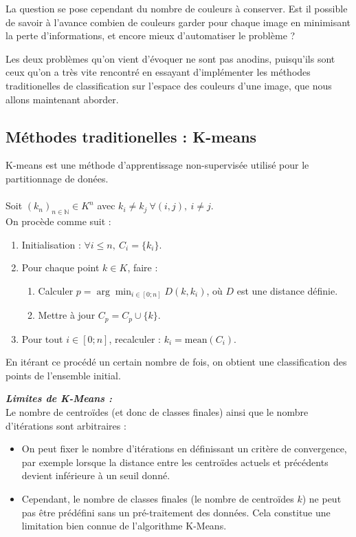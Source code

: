 \documentclass{article}
\begin{document}
La question se pose cependant du nombre de couleurs à conserver. Est il possible de savoir à l'avance combien de couleurs garder pour chaque image en minimisant la perte d'informations, et encore mieux d'automatiser le problème ? 

Les deux problèmes qu'on vient d'évoquer ne sont pas anodins, puisqu'ils sont ceux qu'on a très vite rencontré en essayant d'implémenter les méthodes traditionelles de classification sur l'espace des couleurs d'une image, que nous allons maintenant aborder.
\subsection{Méthodes traditionelles : K-means}
K-means est une méthode d'apprentissage non-supervisée utilisé pour le partitionnage de donées.\\

 \\
Soit $(k_n)_{n \in \mathbb{N}} \in K^n$ avec $k_i \neq k_j \ \forall (i,j), \ i \neq j$. \\
On procède comme suit :
\begin{enumerate}
    \item Initialisation : $\forall i \leq n, \ C_i = \{k_i\}$.
    \item Pour chaque point $k \in K$, faire :
    \begin{enumerate}
        \item Calculer $p = \arg\min_{i \in [0;n]} D(k, k_i)$, où $D$ est une distance définie.
        \item Mettre à jour $C_p = C_p \cup \{k\}$.
    \end{enumerate}
    \item Pour tout $i \in [0;n]$, recalculer : $k_i = \text{mean}(C_i)$.
\end{enumerate}

En itérant ce procédé un certain nombre de fois, on obtient une classification des points de l'ensemble initial.

\bigskip

{\itshape \textbf{Limites de K-Means :}} \\
Le nombre de centroïdes (et donc de classes finales) ainsi que le nombre d'itérations sont arbitraires :
\begin{itemize}
    \item On peut fixer le nombre d'itérations en définissant un critère de convergence, par exemple lorsque la distance entre les centroïdes actuels et précédents devient inférieure à un seuil donné.
    \item Cependant, le nombre de classes finales (le nombre de centroïdes $k$) ne peut pas être prédéfini sans un pré-traitement des données. Cela constitue une limitation bien connue de l'algorithme K-Means.
\end{itemize}
\end{document}
